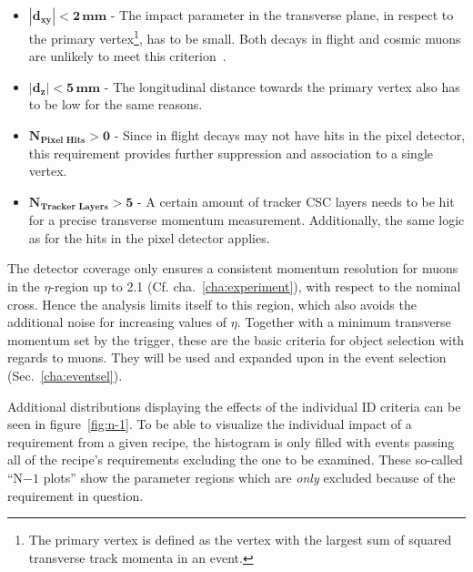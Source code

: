 \begin{itemize}
\item $\mathbf{|d_{xy}| < 2\,\textbf{mm}}$ - The impact parameter in the transverse plane, in respect to the primary vertex\footnote{The primary vertex is defined as the vertex with the largest sum of squared transverse track momenta in an event.}, has to be small. Both decays in flight and cosmic muons are unlikely to meet this criterion~\cite{muonidcosmic}.
\item $\mathbf{|d_z| < 5\,\textbf{mm}}$ - The longitudinal distance towards the primary vertex also has to be low for the same reasons.
\item $\mathbf{N_{\textbf{Pixel Hits}} > 0}$ - Since in flight decays may not have hits in the pixel detector, this requirement provides further suppression and association to a single vertex.
\item $\mathbf{N_{\textbf{Tracker Layers}} > 5}$ - A certain amount of tracker CSC layers needs to be hit for a precise transverse momentum measurement. Additionally, the same logic as for the hits in the pixel detector applies.
\end{itemize}

The detector coverage only ensures a consistent momentum resolution for muons in the $\eta$-region up to 2.1 (Cf. cha.~\ref{cha:experiment}), with respect to the nominal cross. Hence the analysis limits itself to this region, which also avoids the additional noise for increasing values of $\eta$. Together with a minimum transverse momentum set by the trigger, these are the basic criteria for object selection with regards to muons. They will be used and expanded upon in the event selection (Sec.~\ref{cha:eventsel}).

Additional distributions displaying the effects of the individual ID criteria can be seen in figure~\ref{fig:n-1}. To be able to visualize the individual impact of a requirement from a given recipe, the histogram is only filled with events passing all of the recipe's requirements excluding the one to be examined. These so-called ``N$ - 1$ plots'' show the parameter regions which are \textit{only} excluded because of the requirement in question.

